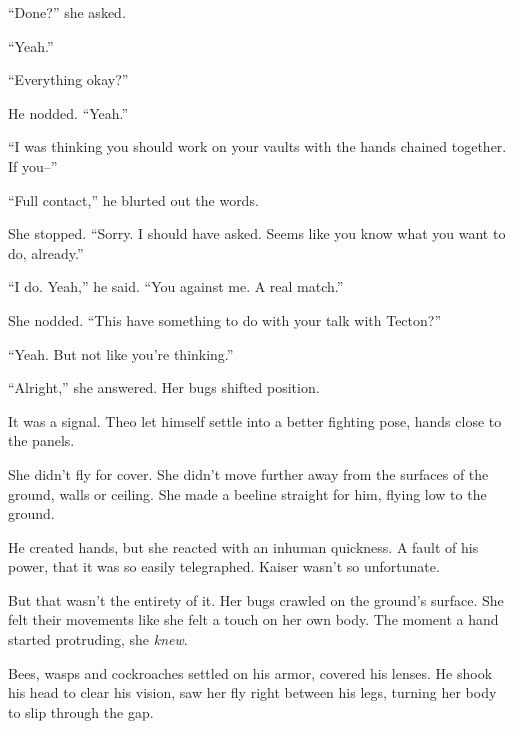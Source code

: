 ``Done?'' she asked.



``Yeah.''



``Everything okay?''



He nodded.  ``Yeah.''



``I was thinking you should work on your vaults with the hands chained together.  If you--''



``Full contact,'' he blurted out the words.



She stopped.  ``Sorry.  I should have asked.  Seems like you know what you want to do, already.''



``I do.  Yeah,'' he said.  ``You against me.  A real match.''



She nodded.  ``This have something to do with your talk with Tecton?''



``Yeah.  But not like you're thinking.''



``Alright,'' she answered.  Her bugs shifted position.



It was a signal.  Theo let himself settle into a better fighting pose, hands close to the panels.



She didn't fly for cover.  She didn't move further away from the surfaces of the ground, walls or ceiling.  She made a beeline straight for him, flying low to the ground.



He created hands, but she reacted with an inhuman quickness.  A fault of his power, that it was so easily telegraphed.  Kaiser wasn't so unfortunate.



But that wasn't the entirety of it.  Her bugs crawled on the ground's surface.  She felt their movements like she felt a touch on her own body.  The moment a hand started protruding, she \emph{knew}.



Bees, wasps and cockroaches settled on his armor, covered his lenses.  He shook his head to clear his vision, saw her fly right between his legs, turning her body to slip through the gap.



